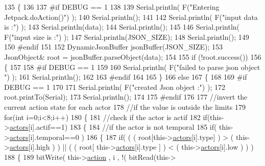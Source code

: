 \begin{DoxyCode}
135 \{
136 
137 \textcolor{preprocessor}{#if DEBUG == 1 }
138 
139     Serial.println( F(\textcolor{stringliteral}{"Entering Jetpack.doAction()"}) );
140     Serial.println();
141 
142     Serial.println( F(\textcolor{stringliteral}{"input data is :"}) );
143     Serial.println(data);
144     Serial.println();
145 
146     Serial.println( F(\textcolor{stringliteral}{"input size is :"}) ); 
147     Serial.println(JSON\_SIZE);
148     Serial.println();
149 
150 \textcolor{preprocessor}{#endif }
151 
152     DynamicJsonBuffer jsonBuffer(JSON\_SIZE);
153     JsonObject& root = jsonBuffer.parseObject(data);
154     
155     \textcolor{keywordflow}{if} (!root.success()) 
156     \{
157     
158 \textcolor{preprocessor}{    #if DEBUG == 1 }
159 
160         Serial.println( F(\textcolor{stringliteral}{"failed to parse json object "}) );
161         Serial.println();
162     
163 \textcolor{preprocessor}{    #endif }
164 
165     \}
166     \textcolor{keywordflow}{else}
167     \{
168     
169 \textcolor{preprocessor}{    #if DEBUG == 1 }
170 
171         Serial.println( F(\textcolor{stringliteral}{"created Json object :"}) );
172         root.printTo(Serial);
173         Serial.println();
174     
175 \textcolor{preprocessor}{    #endif }
176 
177         \textcolor{comment}{//invert the current action state for each actor}
178         \textcolor{comment}{//if the value is outside the limits}
179         \textcolor{keywordflow}{for}(\textcolor{keywordtype}{int} i=0;i<8;i++)
180         \{
181             \textcolor{comment}{//check if the actor is actif }
182             \textcolor{keywordflow}{if}(this->\hyperlink{classJetpack_a7e16d2f97837f9712a2e6de1c50d99db}{actors}[i].actif==1)
183             \{   
184                 \textcolor{comment}{//if the actor is not temporal}
185                 \textcolor{keywordflow}{if}( this->\hyperlink{classJetpack_a7e16d2f97837f9712a2e6de1c50d99db}{actors}[i].temporal==0 ) 
186                 \{
187                     \textcolor{keywordflow}{if}( ( ( root[this->\hyperlink{classJetpack_a7e16d2f97837f9712a2e6de1c50d99db}{actors}[i].type] ) > ( this->\hyperlink{classJetpack_a7e16d2f97837f9712a2e6de1c50d99db}{actors}[i].high ) ) || ( ( 
      root[ this->\hyperlink{classJetpack_a7e16d2f97837f9712a2e6de1c50d99db}{actors}[i].type ] ) < ( this->\hyperlink{classJetpack_a7e16d2f97837f9712a2e6de1c50d99db}{actors}[i].low ) ) )   
188                     \{   
189                         bitWrite( this->\hyperlink{classJetpack_aca3142925a7b0834b34ae91d26af7765}{action} , i , !( bitRead(this->

\end{DoxyCode}
